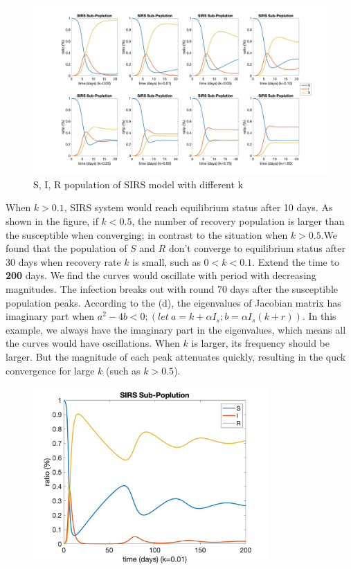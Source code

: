 \documentclass[12pt,a4paper]{article}
\begin{document}
\begin{figure}[!ht]
    \includegraphics[width=\textwidth]{hw10_8_b1.png}
    \caption{S, I, R population of SIRS model with different k}
\end{figure}

When $k>0.1$, SIRS system would reach equilibrium status after 10 days. As shown in the figure, if $k<0.5$, the number of recovery population is larger than the susceptible when converging; in contrast to the situation when $k>0.5$.We found that the population of $S$ and $R$ don't converge to equilibrium status after 30 days when recovery rate $k$ is small, such as $0<k<0.1$. Extend the time to \textbf{200} days. We find the curves would oscillate with period with decreasing magnitudes. The infection breaks out with round 70 days after the susceptible population peaks. According to the (d), the eigenvalues of Jacobian matrix has imaginary part when $a^2-4b<0; (let\ a=k+\alpha I_s;b=\alpha I_s(k+r))$. In this example, we always have the imaginary part in the eigenvalues, which means all the curves would have oscillations. When $k$ is larger, its frequency should be larger. But the magnitude of each peak attenuates quickly, resulting in the quck convergence for large $k$ (such as $k>0.5$). 

\begin{figure}[!ht]
    \centering
    \includegraphics[width=0.8\textwidth]{hw10_8_b2.png}
\end{figure}
\end{document}
